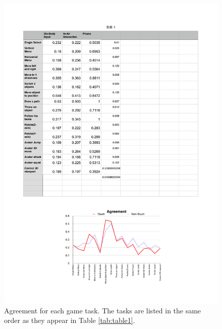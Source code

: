 \documentclass{sigchi}
\begin{document}
 \begin{figure}[!h]
  \centering
  \includegraphics[width=1\columnwidth]{Agreement.pdf}

  \caption{Agreement for each game task. The tasks are listed in the same order as they appear in Table \ref{tab:table1}.}
  \label{fig:Agreement}
  \end{figure} 


\end{document}
